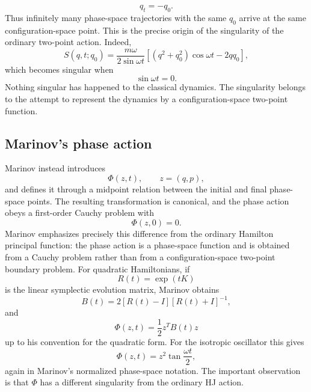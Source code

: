 \begin{equation}
q_t=-q_0.
\end{equation}
Thus infinitely many phase-space trajectories with the same \(q_0\) arrive at
the same configuration-space point.
This is the precise origin of the singularity of the ordinary two-point
action.
Indeed,
\begin{equation}
S(q,t;q_0)=\frac{m\omega}{2\sin\omega t}
\left[
(q^2+q_0^2)\cos\omega t-2qq_0
\right],
\label{oscS}
\end{equation}
which becomes singular when
\begin{equation}
\sin\omega t=0.
\end{equation}
Nothing singular has happened to the classical dynamics.  The singularity
belongs to the attempt to represent the dynamics by a configuration-space
two-point function.
\subsection{Marinov's phase action}
Marinov instead introduces
\begin{equation}
\Phi(z,t),\qquad z=(q,p),
\end{equation}
and defines it through a midpoint relation between the initial and final
phase-space points.  The resulting transformation is canonical, and the
phase action obeys a first-order Cauchy problem with
\begin{equation}
\Phi(z,0)=0.
\end{equation}
Marinov emphasizes precisely this difference from the ordinary Hamilton
principal function: the phase action is a phase-space function and is obtained
from a Cauchy problem rather than from a configuration-space two-point
boundary problem. \cite{Marinov1979}
For quadratic Hamiltonians, if
\begin{equation}
R(t)=\exp(tK)
\end{equation}
is the linear symplectic evolution matrix, Marinov obtains
\begin{equation}
B(t)=2[R(t)-I][R(t)+I]^{-1},
\label{Cayley}
\end{equation}
and
\begin{equation}
\Phi(z,t)=\frac12 z^T B(t)z
\end{equation}
up to his convention for the quadratic form. \cite{Marinov1979}
For the isotropic oscillator this gives
\begin{equation}
\Phi(z,t)=z^2\tan\frac{\omega t}{2},
\label{oscPhi}
\end{equation}
again in Marinov's normalized phase-space notation. \cite{Marinov1979}
The important observation is that \(\Phi\) has a different singularity from
the ordinary HJ action.
